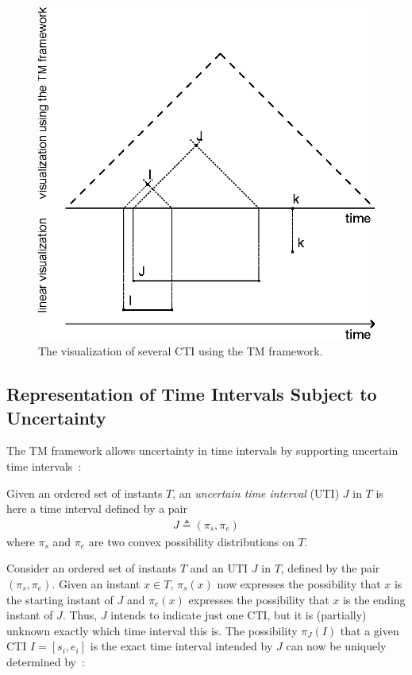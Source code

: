 \begin{figure}[h]
	\centering
	\includegraphics[width=0.9\columnwidth]{graphs/TM_model_several.eps}
	\caption{The visualization of several CTI using the TM framework.}
	\label{fig:tm-const-ex}
\end{figure}

\subsection{\label{subsec:tm-interval}Representation of Time Intervals Subject to Uncertainty}
The TM framework allows uncertainty in time intervals by supporting uncertain time intervals~\cite{DeTre2012}:

\begin{definition}
Given an ordered set of instants $T$, an \emph{uncertain time interval} (UTI) $J$ in $T$ is here a time interval defined by a pair
\begin{align}
J \triangleq (\pi_s, \pi_e)
\end{align}
where $\pi_s$ and $\pi_e$ are two convex possibility distributions on $T$.
\end{definition}

Consider an ordered set of instants $T$ and an UTI $J$ in $T$, defined by the pair $(\pi_s, \pi_e)$. Given an instant $x \in T$, $\pi_s(x)$ now expresses the possibility that $x$ is the starting instant of $J$ and $\pi_e(x)$ expresses the possibility that $x$ is the ending instant of $J$. Thus, $J$ intends to indicate just one CTI, but it is (partially) unknown exactly which time interval this is. The possibility $\pi_J(I)$ that a given CTI $I = \left[s_i, e_i\right]$ is the exact time interval intended by $J$ can now be uniquely determined by~\cite{DeTre2012}:

